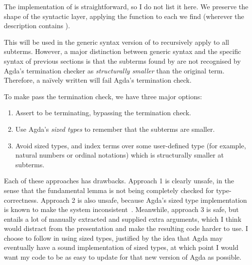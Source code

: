 
The implementation of  is straightforward, so I do not list
it here.
We preserve
the shape of the syntactic layer, applying the function to each 
we find (wherever the description contains \AgdaInductiveConstructor{$\langle$}%
\AgdaSpace{}\AgdaBound{$\Delta$}\AgdaSpace{}%
\AgdaSpace{}\AgdaSpace{}%
\AgdaInductiveConstructor{$\rangle$}).

This  will be used in the generic syntax version of
 to recursively apply  to all subterms.
However, a major distinction between generic syntax and the specific syntax of
previous sections is that the subterms found by  are not
recognised by Agda's termination checker as \emph{structurally smaller} than
the original term.
Therefore, a na\"{i}vely written  will fail Agda's termination
check.

To make  pass the termination check, we have three major
options:
\begin{enumerate}
  \item Assert  to be terminating, bypassing the termination
    check.
  \item Use Agda's \emph{sized types} to remember that the subterms are smaller.
  \item Avoid sized types, and index terms over some user-defined type (for
    example, natural numbers or ordinal notations) which is structurally smaller
    at subterms.
\end{enumerate}

Each of these approaches has drawbacks.
Approach 1 is clearly unsafe, in the sense that the fundamental lemma
 is not being completely checked for type-correctness.
Approach 2 is also unsafe, because Agda's sized type implementation is known to
make the system inconsistent~\citep{AgdaIssue1201}.
Meanwhile, approach 3 is safe, but entails a lot of manually extracted and
supplied extra arguments, which I think would distract from the presentation and
make the resulting code harder to use.
I choose to follow \citet{AACMM21} in using sized types, justified by the idea
that Agda may eventually have a sound implementation of sized types, at which
point I would want my code to be as easy to update for that new version of Agda
as possible.

